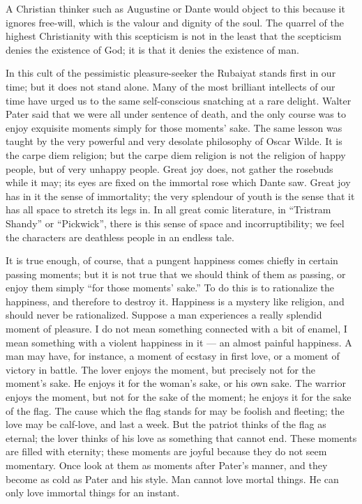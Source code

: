 A Christian thinker such as Augustine or Dante would object to this because it ignores free-will, which is the valour and dignity of the soul. The quarrel of the highest Christianity with this scepticism is not in the least that the scepticism denies the existence of God; it is that it denies the existence of man.

In this cult of the pessimistic pleasure-seeker the Rubaiyat stands first in our time; but it does not stand alone. Many of the most brilliant intellects of our time have urged us to the same self-conscious snatching at a rare delight. Walter Pater said that we were all under sentence of death, and the only course was to enjoy exquisite moments simply for those moments’ sake. The same lesson was taught by the very powerful and very desolate philosophy of Oscar Wilde. It is the carpe diem religion; but the carpe diem religion is not the religion of happy people, but of very unhappy people. Great joy does, not gather the rosebuds while it may; its eyes are fixed on the immortal rose which Dante saw. Great joy has in it the sense of immortality; the very splendour of youth is the sense that it has all space to stretch its legs in. In all great comic literature, in “Tristram Shandy” or “Pickwick”, there is this sense of space and incorruptibility; we feel the characters are deathless people in an endless tale.

It is true enough, of course, that a pungent happiness comes chiefly in certain passing moments; but it is not true that we should think of them as passing, or enjoy them simply “for those moments’ sake.” To do this is to rationalize the happiness, and therefore to destroy it. Happiness is a mystery like religion, and should never be rationalized. Suppose a man experiences a really splendid moment of pleasure. I do not mean something connected with a bit of enamel, I mean something with a violent happiness in it — an almost painful happiness. A man may have, for instance, a moment of ecstasy in first love, or a moment of victory in battle. The lover enjoys the moment, but precisely not for the moment’s sake. He enjoys it for the woman’s sake, or his own sake. The warrior enjoys the moment, but not for the sake of the moment; he enjoys it for the sake of the flag. The cause which the flag stands for may be foolish and fleeting; the love may be calf-love, and last a week. But the patriot thinks of the flag as eternal; the lover thinks of his love as something that cannot end. These moments are filled with eternity; these moments are joyful because they do not seem momentary. Once look at them as moments after Pater’s manner, and they become as cold as Pater and his style. Man cannot love mortal things. He can only love immortal things for an instant.

